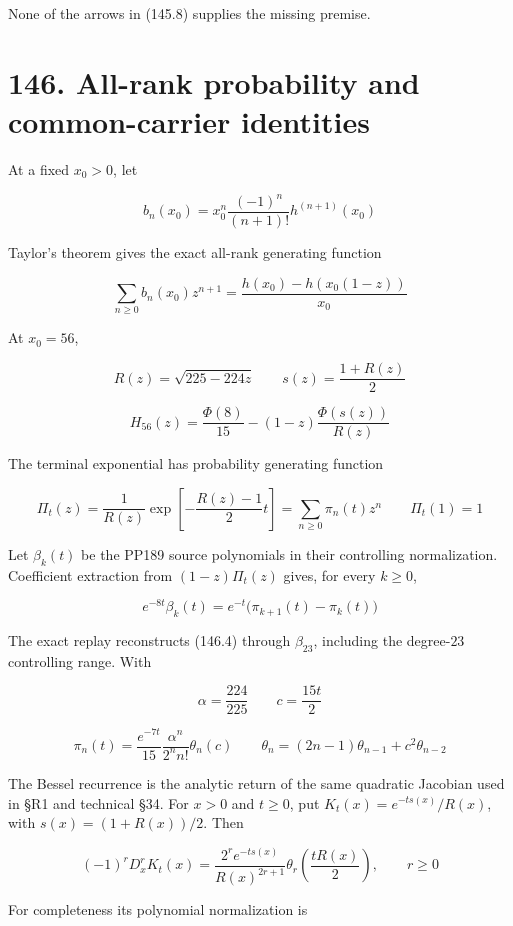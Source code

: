 \documentclass[
  11pt,
]{book}
\begin{document}
None of the arrows in (145.8) supplies the missing premise.

\section{146. All-rank probability and common-carrier
identities}\label{all-rank-probability-and-common-carrier-identities}

At a fixed \(x_0>0\), let

\[
b_n(x_0)=x_0^n\frac{(-1)^n}{(n+1)!}h^{(n+1)}(x_0)
\]

Taylor's theorem gives the exact all-rank generating function

\[
\boxed{
\sum_{n\ge0}b_n(x_0)z^{n+1}
=\frac{h(x_0)-h(x_0(1-z))}{x_0}}
\tag{146.1}
\]

At \(x_0=56\),

\[
R(z)=\sqrt{225-224z}
\qquad
s(z)=\frac{1+R(z)}2
\]

\[
\boxed{
H_{56}(z)
=\frac{\Phi(8)}{15}
-(1-z)\frac{\Phi(s(z))}{R(z)}}
\tag{146.2}
\]

The terminal exponential has probability generating function

\[
\boxed{
\Pi_t(z)=\frac1{R(z)}
\exp\!\left[-\frac{R(z)-1}{2}t\right]
=\sum_{n\ge0}\pi_n(t)z^n
\qquad \Pi_t(1)=1}
\tag{146.3}
\]

Let \(\beta_k(t)\) be the PP189 source polynomials in their controlling
normalization. Coefficient extraction from \((1-z)\Pi_t(z)\) gives, for
every \(k\ge0\),

\[
\boxed{
e^{-8t}\beta_k(t)
=e^{-t}\bigl(\pi_{k+1}(t)-\pi_k(t)\bigr)}
\tag{146.4}
\]

The exact replay reconstructs (146.4) through \(\beta_{23}\), including
the degree-\(23\) controlling range. With

\[
\alpha=\frac{224}{225}
\qquad c=\frac{15t}{2}
\]

\[
\pi_n(t)
=\frac{e^{-7t}}{15}
\frac{\alpha^n}{2^nn!}\theta_n(c)
\qquad
\theta_n=(2n-1)\theta_{n-1}+c^2\theta_{n-2}
\tag{146.5}
\]

The Bessel recurrence is the analytic return of the same quadratic
Jacobian used in §R1 and technical §34. For \(x>0\) and \(t\ge0\), put
\(K_t(x)=e^{-t s(x)}/R(x)\), with \(s(x)=(1+R(x))/2\). Then

\[
\boxed{(-1)^rD_x^rK_t(x)
=\frac{2^r e^{-t s(x)}}{R(x)^{2r+1}}
\theta_r\!\left(\frac{tR(x)}2\right),\qquad r\ge0}
\tag{146.5a}
\]

For completeness its polynomial normalization is
\end{document}
